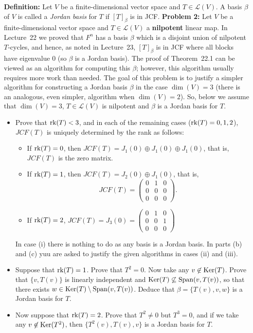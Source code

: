 \documentclass[11pt]{amsart}
\begin{document}
{\bf Definition:}  Let $V$ be a finite-dimensional vector space and
$T\in\mathcal L(V)$. A basis $\beta$ of $V$ is called a \emph{Jordan basis} for $T$ if $[T]_{\beta}$ is in JCF. 
\skv
{\bf Problem 2:} Let $V$ be a finite-dimensional vector space and
$T\in\mathcal L(V)$ a {\bf nilpotent} linear map. 
In Lecture~22 we proved that $F^n$ has a basis $\beta$ which is a disjoint union of nilpotent $T$-cycles,
and hence, as noted in Lecture~23, $[T]_{\beta}$ is in JCF where all blocks have eigenvalue $0$ (so
$\beta$ is a Jordan basis). The proof of Theorem~22.1 can be viewed as an algorithm for computing this $\beta$;
however, this algorithm usually requires more work than needed.  
The goal of this problem is to justify a simpler algorithm for constructing a Jordan basis $\beta$ in the case $\dim(V)=3$
(there is an analogous, even simpler, algorithm when $\dim(V)=2$).
\skv
So, below we assume that $\dim(V)=3$, $T\in\mathcal L(V)$ is nilpotent
and $\beta$ is a Jordan basis for $T$. 
\begin{itemize}
\item[(a)] Prove that ${\rm rk}(T)<3$, and in each of the remaining cases (${\rm rk}(T)=0,1,2$), $JCF(T)$ is uniquely determined by the rank as follows: 
\begin{itemize}
\item[(i)] If ${\rm rk}(T)=0$, then $JCF(T)=J_1(0)\oplus J_1(0)\oplus J_1(0)$, that is, $JCF(T)$ is the zero matrix.
\item[(ii)] If ${\rm rk}(T)=1$, then $JCF(T)=J_2(0)\oplus J_1(0)$, that is, $$JCF(T)=\begin{pmatrix} 0 &1&0\\ 0 &0&0\\ 0 &0&0
\end{pmatrix}.$$
\item[(iii)] If ${\rm rk}(T)=2$, $JCF(T)=J_3(0)=\begin{pmatrix} 0 &1&0\\ 0 &0&1\\ 0 &0&0\end{pmatrix}
$
\end{itemize}
In case (i) there is nothing to do as any basis is a Jordan basis. In parts (b) and (c)
yuu are asked to justify the given algorithms in cases (ii) and (iii).

\item[(b)] Suppose that ${\rm rk}(T)=1$. Prove that $T^2=0$. Now take any $v\not\in{\rm Ker}(T)$. Prove that $\{v,T(v)\}$ is linearly independent
and ${\rm Ker}(T)\not\subseteq {\rm Span}(v,T(v))$, so that there exists $w\in {\rm Ker}(T)\setminus {\rm Span}(v,T(v))$. Deduce that
$\beta=\{T(v),v,w\}$ is a Jordan basis for $T$.
\item[(c)] Now suppose that ${\rm rk}(T)=2$. Prove that $T^2\neq 0$ but $T^3=0$, and if we take any $v\not\in{\rm Ker}(T^2)$, then $\{T^2(v),T(v),v\}$ is a Jordan basis for $T$.
\end{itemize}
\end{document}
